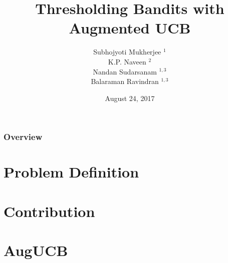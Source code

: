 \documentclass{beamer}
\title[Thresholding Bandits with Augmented UCB]{Thresholding Bandits with Augmented UCB} %
\author{Subhojyoti Mukherjee $^{1}$ \\ K.P. Naveen $^{2}$ \\ Nandan Sudarsanam $^{1,3}$ \\ Balaraman Ravindran $^{1,3}$ } %
\institute[$^{1}$ IIT Madras \\ $^{2}$ IIT Tirupati] %
{
$^{1}$ IIT Madras, $^{2}$ IIT Tirupati, \\ $^{3}$ Robert Bosch Centre for Data Science and AI \\ %
\medskip
}
\date{August 24, 2017}
\begin{document}
\nocite{*}
\begin{frame}
\titlepage %
\end{frame}

\begin{frame}
\frametitle{Overview} %
\tableofcontents %
\end{frame}



%

%

\section{Problem Definition}


\section{Contribution}


%

\section{AugUCB}

\end{document}
